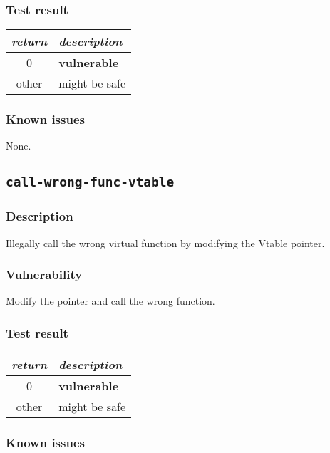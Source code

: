 \documentclass[a4paper]{book}
\begin{document}
\subsubsection{Test result}
\begin{tabular}{cl}
  \toprule
  \emph{return}  & \emph{description} \\
  \midrule
  0              & \textbf{vulnerable} \\
  other          & might be safe \\
  \bottomrule
\end{tabular}
  
\subsubsection{Known issues}
None.

\newpage

\subsection{\texttt{call-wrong-func-vtable}}\label{test-call-wrong-func-vtable}

\subsubsection{Description}
Illegally call the wrong virtual function by modifying the Vtable pointer.
\subsubsection{Vulnerability}
Modify the pointer and call the wrong function.

\subsubsection{Test result}
\begin{tabular}{cl}
  \toprule
  \emph{return}  & \emph{description} \\
  \midrule
  0              & \textbf{vulnerable} \\
  other          & might be safe \\
  \bottomrule
\end{tabular}
  
\subsubsection{Known issues}

\newpage
\end{document}
